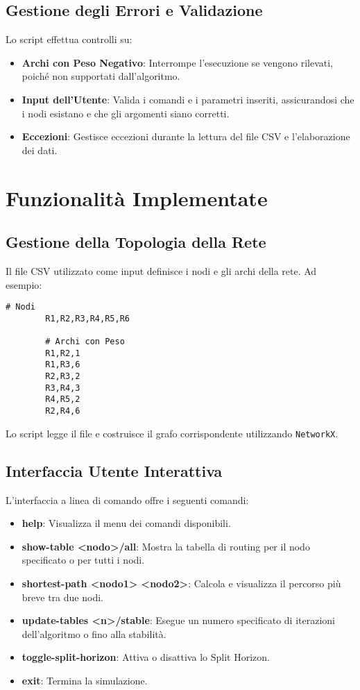 \documentclass[a4paper,12pt]{article}
\begin{document}
	\subsection{Gestione degli Errori e Validazione}
	
	Lo script effettua controlli su:
	
	\begin{itemize}
		\item \textbf{Archi con Peso Negativo}: Interrompe l'esecuzione se vengono rilevati, poiché non supportati dall'algoritmo.
		\item \textbf{Input dell'Utente}: Valida i comandi e i parametri inseriti, assicurandosi che i nodi esistano e che gli argomenti siano corretti.
		\item \textbf{Eccezioni}: Gestisce eccezioni durante la lettura del file CSV e l'elaborazione dei dati.
	\end{itemize}
	
	\section{Funzionalità Implementate}
	
	\subsection{Gestione della Topologia della Rete}
	
	Il file CSV utilizzato come input definisce i nodi e gli archi della rete. Ad esempio:
	
	\begin{lstlisting}[language={}, caption={Esempio di file CSV per la rete}, float]
		# Nodi
		R1,R2,R3,R4,R5,R6
		
		# Archi con Peso
		R1,R2,1
		R1,R3,6
		R2,R3,2
		R3,R4,3
		R4,R5,2
		R2,R4,6
	\end{lstlisting}
	
	Lo script legge il file e costruisce il grafo corrispondente utilizzando \texttt{NetworkX}.
	
	\subsection{Interfaccia Utente Interattiva}
	
	L'interfaccia a linea di comando offre i seguenti comandi:
	
	\begin{itemize}
		\item \textbf{help}: Visualizza il menu dei comandi disponibili.
		\item \textbf{show-table <nodo>/all}: Mostra la tabella di routing per il nodo specificato o per tutti i nodi.
		\item \textbf{shortest-path <nodo1> <nodo2>}: Calcola e visualizza il percorso più breve tra due nodi.
		\item \textbf{update-tables <n>/stable}: Esegue un numero specificato di iterazioni dell'algoritmo o fino alla stabilità.
		\item \textbf{toggle-split-horizon}: Attiva o disattiva lo Split Horizon.
		\item \textbf{exit}: Termina la simulazione.
	\end{itemize}
	
\end{document}

